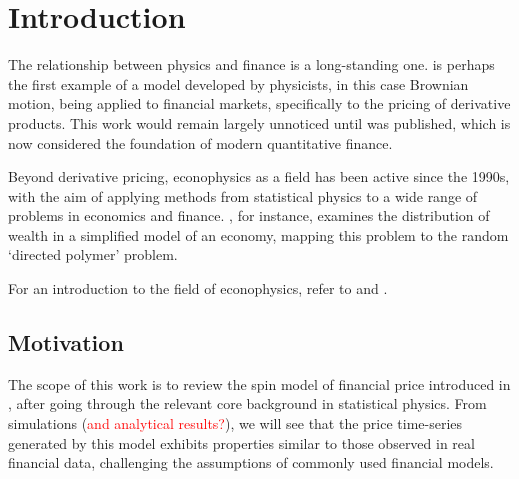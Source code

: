 \chapter{Introduction}\label{ch:introduction}
The relationship between physics and finance is a long-standing one. \cite{bachelier} is perhaps the first example of a model developed by physicists, in this case Brownian motion, being applied to financial markets, specifically to the pricing of derivative products. This work would remain largely unnoticed until \cite{black_scholes} was published, which is now considered the foundation of modern quantitative finance.

Beyond derivative pricing, econophysics as a field has been active since the 1990s, with the aim of applying methods from statistical physics to a wide range of problems in economics and finance. \cite{bouchaud_mezard_2000}, for instance, examines the distribution of wealth in a simplified model of an economy, mapping this problem to the random `directed polymer' problem.

For an introduction to the field of econophysics, refer to  \cite{Mantegna_Stanley_1999} and \cite{econophysics_2011_review}.

\section{Motivation}
The scope of this work is to review the spin model of financial price introduced in \cite{bornholdt}, after going through the relevant core background in statistical physics. From simulations (\textcolor{red}{and analytical results?}), we will see that the price time-series generated by this model exhibits properties similar to those observed in real financial data, challenging the assumptions of commonly used financial models. 